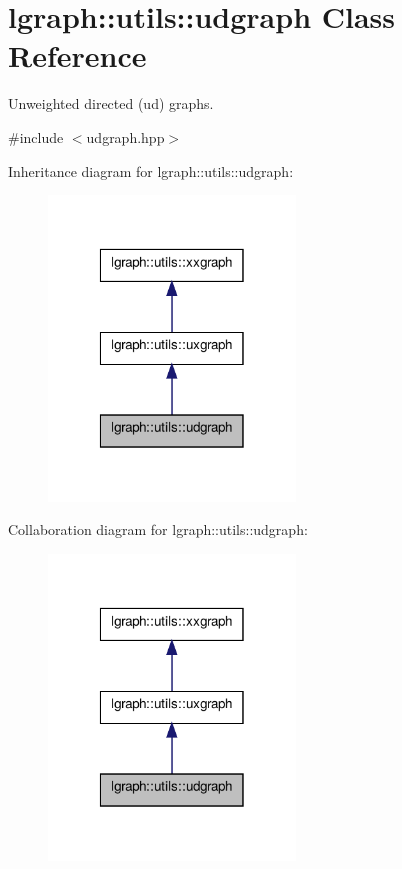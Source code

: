 \hypertarget{classlgraph_1_1utils_1_1udgraph}{\section{lgraph\-:\-:utils\-:\-:udgraph Class Reference}
\label{classlgraph_1_1utils_1_1udgraph}
}


Unweighted directed (ud) graphs.  




{\ttfamily \#include $<$udgraph.\-hpp$>$}



Inheritance diagram for lgraph\-:\-:utils\-:\-:udgraph\-:\nopagebreak
\begin{figure}[H]
\begin{center}
\leavevmode
\includegraphics[width=186pt]{classlgraph_1_1utils_1_1udgraph__inherit__graph}
\end{center}
\end{figure}


Collaboration diagram for lgraph\-:\-:utils\-:\-:udgraph\-:\nopagebreak
\begin{figure}[H]
\begin{center}
\leavevmode
\includegraphics[width=186pt]{classlgraph_1_1utils_1_1udgraph__coll__graph}
\end{center}
\end{figure}
